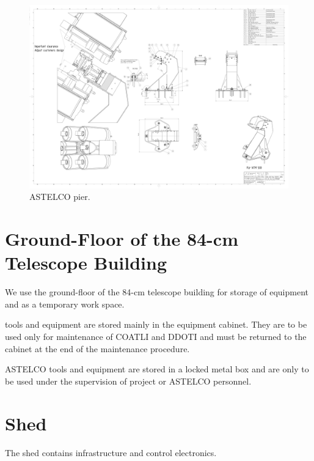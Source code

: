 \begin{figure}
\begin{center}
\includegraphics[height=0.75\linewidth,angle=90]{figures/buildings-ddoti-astelco-pier-drawing-3234}
\end{center}
\caption{{\projectname} ASTELCO pier.}
\label{figure:buildings-drawing-astelco-pier}
\end{figure}

\fi

\section{Ground-Floor of the 84-cm Telescope Building}

We use the ground-floor of the 84-cm telescope building for storage of equipment and as a temporary work space.

{\projectname} tools and equipment are stored mainly in the equipment cabinet. They are to be used only for maintenance of COATLI and DDOTI and must be returned to the cabinet at the end of the maintenance procedure.

ASTELCO tools and equipment are stored in a locked metal box and are only to be used under the supervision of project or ASTELCO personnel.

\section{Shed}
\label{section:shed}
\label{section:shed-key}

The shed contains infrastructure and control electronics.

